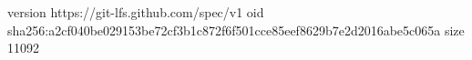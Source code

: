 version https://git-lfs.github.com/spec/v1
oid sha256:a2cf040be029153be72cf3b1c872f6f501cce85eef8629b7e2d2016abe5c065a
size 11092
